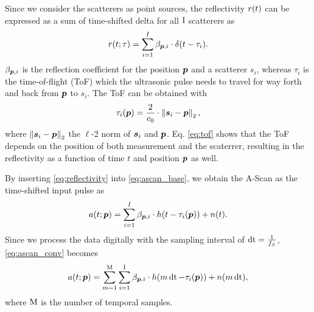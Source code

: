 Since we consider the scatterers as point sources, the reflectivity $r (t)$ can be expressed as a sum of time-shifted delta for all $\operatorname{I}$ scatterers as
\begin{equation} \label{eq:reflectivity}
\reflectivity (t; \tau) = \sum_{i = 1}^{I} \refcoeff_{\pp, i} \cdot \delta (t - \tau_{i}).
\end{equation}
$\beta_{\bm{p}, i}$ is the reflection coefficient for the position $\bm{p}$ and a scatterer $s_i$, whereas $\tau_{i}$ is the time-of-flight (ToF) which the ultrasonic pulse needs to travel for way forth and back from $\bm{p}$ to $s_i$. 
The ToF can be obtained with 
\begin{equation} \label{eq:tof}
\tau_{i}(\pp) = \frac{2}{c_0} \cdot \norm{\scatterer_{i} - \pp }_{2},
\end{equation}
where $\left\lVert\bm{s}_{i} - \bm{p} \right\rVert_{2}$ the $\ell$-2 norm of $\bm{s}_{i}$ and $\bm{p}$. Eq. \eqref{eq:tof} shows that the ToF depends on the position of both measurement and the scaterrer, resulting in the reflectivity as a function of time $t$ and position $\bm{p}$ as well.  \par

By inserting \eqref{eq:reflectivity} into \eqref{eq:ascan_base}, we obtain the A-Scan as the time-shifted input pulse as
\begin{equation} \label{eq:ascan_conv}
\ascan (t; \pp) = \sum_{i = 1}^{I} \refcoeff_{\pp, i} \cdot \pulse (t - \tau_{i} (\pp) ) + n(t).
\end{equation}
Since we process the data digitally with the sampling interval of $\operatorname{dt} = \frac{1}{f_S}$, \eqref{eq:ascan_conv} becomes
\begin{equation} \label{eq:ascan_discrete}
\ascan (t; \pp) = \sum_{m = 1}^{\M} \sum_{i = 1}^{\I} \refcoeff_{\pp, i} \cdot \pulse (m \dt - \tau_{i} (\pp) ) + n(m \dt),
\end{equation}
where $\operatorname{M}$ is the number of temporal samples. \par


